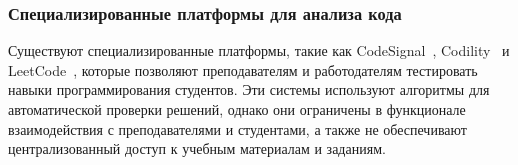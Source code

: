 \subsubsection{Специализированные платформы для анализа кода}
Существуют специализированные платформы, такие как CodeSignal~\cite{codesignal_wiki}, Codility~\cite{codility_wiki} и LeetCode~\cite{leetcode_wiki}, которые позволяют преподавателям и работодателям тестировать навыки программирования студентов. Эти системы используют алгоритмы для автоматической проверки решений, однако они ограничены в функционале взаимодействия с преподавателями и студентами, а также не обеспечивают централизованный доступ к учебным материалам и заданиям.
